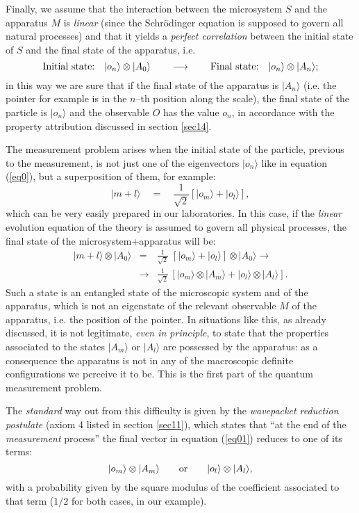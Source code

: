 \documentclass[10pt,a4paper]{article}
\begin{document}
Finally, we assume that the interaction between the microsystem
$S$ and the apparatus $M$ is {\it linear} (since the Schr\"odinger
equation is supposed to govern all natural processes) and that it
yields a {\it perfect  correlation} between the initial state of
$S$ and the final state of  the apparatus, i.e.
\begin{equation} \label{eq0}
\makebox{Initial state:
$\;\;|o_{n}\rangle\otimes|A_{0}\rangle$}\qquad
\longrightarrow\qquad \makebox{Final state:
$\;\;|o_{n}\rangle\otimes|A_{n}\rangle$};
\end{equation}
in this way we are sure that if the final state of the apparatus
is $|A_{n}\rangle$ (i.e. the pointer for example is in the $n$--th
position along the scale), the final state of the particle is
$|o_{n}\rangle$ and the observable $O$ has the value $o_{n}$, in
accordance with the property attribution discussed in section
\ref{sec14}.

The measurement problem arises when the initial state of the
particle, previous to the measurement, is not just one of the
eigenvectors $|o_{n}\rangle$ like in equation (\ref{eq0}), but a
superposition of them, for example:
\[
|m + l\rangle\quad =\quad \frac{1}{\sqrt{2}}[ |o_{m}\rangle +
|o_{l}\rangle],
\]
which can be very easily prepared in our laboratories. In this
case, if the {\it linear} evolution equation of the theory is
assumed to govern all physical processes, the final state of the
microsystem+apparatus will be:
\begin{eqnarray} \label{eq01}
|m + l\rangle\otimes|A_{0}\rangle & = & \frac{1}{\sqrt{2}}\;[
|o_{m}\rangle + |o_{l}\rangle]\otimes|A_{0}\rangle \longrightarrow
\nonumber \\
& \longrightarrow & \frac{1}{\sqrt{2}}\,[|o_{m}\rangle\otimes
|A_{m}\rangle + |o_{l}\rangle\otimes|A_{l}\rangle ].
\end{eqnarray}
Such a state is an entangled state of the microscopic system and
of the apparatus, which is not an eigenstate of the relevant
observable  $M$ of the apparatus, i.e. the position of the pointer.
In situations like this, as already discussed, it is not
legitimate, {\it even in principle}, to state that the properties
associated to the states $|A_{m}\rangle$  or $|A_{l}\rangle$ are
possessed by the apparatus: as a consequence the apparatus is not
in any of the macroscopic definite configurations we perceive it
to be. This is the first part of the quantum measurement problem.

The {\it standard} way out from this difficulty is given by the
{\it wavepacket reduction postulate} (axiom 4 listed in section
\ref{sec11}), which states that ``at the end of the {\it
measurement} process'' the final vector in equation (\ref{eq01})
reduces to one of its terms:
\[
|o_{m}\rangle\otimes|A_{m}\rangle \qquad \makebox{or} \qquad
|o_{l}\rangle\otimes|A_{l}\rangle,
\]
with a probability given by the square modulus of the coefficient
associated to that term ($1/2$ for both cases, in our example).
\end{document}
